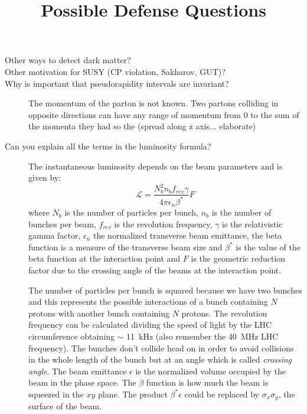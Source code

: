 \documentclass[a4paper,10pt,twoside,notitlepage]{article}
\title{Possible Defense Questions}
\begin{document}
\maketitle

\begin{description}
\item[Other ways to detect dark matter?]

\item[Other motivation for SUSY (CP violation, Sakharov, GUT)?]

\item[Why is important that pseudorapidity intervals are invariant?] The
  momentum of the parton is not known. Two partons colliding in opposite
  directions can have any range of momentum from 0 to the sum of the momenta
  they had so the (spread along z axis... elaborate)

\item[Can you explain all the terms in the luminosity formula?] The
  instantaneous luminosity depends on the beam parameters and is given by:
  \begin{equation}
    \label{eq:1}
    \mathcal{L} = \frac{N^2_b n_b f_{rev} \gamma}{4 \pi \epsilon_n \beta^*} F
  \end{equation}
  where $N_b$ is the number of particles per bunch, $n_b$ is the number of
  bunches per beam, $f_{rev}$ is the revolution frequency, $\gamma$ is the
  relativistic gamma factor, $\epsilon_n$ the normalized transverse beam
  emittance, the beta function is a measure of the transverse beam size and
  $\beta^*$ is the value of the beta function at the interaction point and $F$
  is the geometric reduction factor due to the crossing angle of the beams at
  the interaction point.

  The number of particles per bunch is squared because we have two bunches and
  this represents the possible interactions of a bunch containing $N$ protons
  with another bunch containing $N$ protons. The revolution frequency can be
  calculated dividing the speed of light by the LHC circumference obtaining
  $\sim$ 11~kHz (also remember the 40~MHz LHC frequency). The bunches don't
  collide head on in order to avoid collisions in the whole length of the bunch
  but at an angle which is called \emph{crossing angle}. The beam emittance
  $\epsilon$ is the normalized volume occupied by the beam in the phase
  space. The $\beta$ function is how much the beam is squeezed in the $xy$
  plane. The product $\beta^* \epsilon$ could be replaced by $\sigma_x
  \sigma_y$, the surface of the beam.


\end{description}
\end{document}
